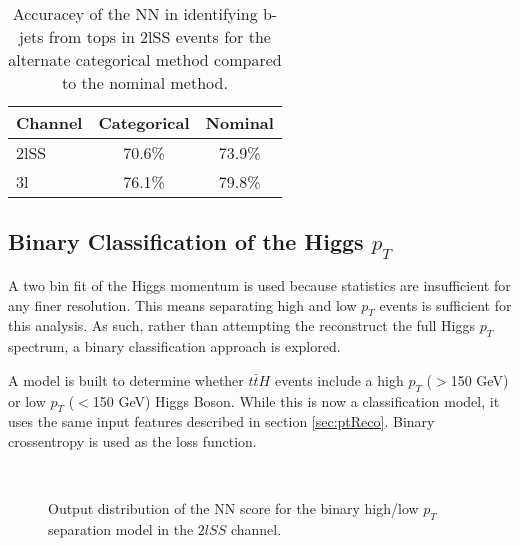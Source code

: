 \begin{table}[H]
  \centering
  \caption{Accuracey of the NN in identifying b-jets from tops in 2lSS events for the alternate categorical method compared to the nominal method.}
  \begin{tabular}{l|c|c}                                                                                                     
  \hline\hline
  Channel & Categorical & Nominal \\                                                                              
  \hline                                                                                                                  
  2lSS & 70.6\% & 73.9\% \\
  3l & 76.1\% & 79.8\% \\
  \hline                                                                                                                 
  \end{tabular}                                                                                                           
  \label{tab:topMatchCatApx}
\end{table}

\subsection{Binary Classification of the Higgs $p_T$}
\label{subsec:binPtApx}
                                                                                                                     
A two bin fit of the Higgs momentum is used because statistics are insufficient for any finer resolution. This means separating high and low $p_T$ events is sufficient for this analysis. As such, rather than attempting the reconstruct the full Higgs $p_T$ spectrum, a binary classification approach is explored.

A model is built to determine whether $t\bar{t}H$ events include a high $p_T$ ($>$150 GeV) or low $p_T$ ($<$150 GeV) Higgs Boson. While this is now a classification model, it uses the same input features described in section \ref{sec:ptReco}. Binary crossentropy is used as the loss function.

\begin{figure}[H]                                                                                                           
  \\
  \caption{Output distribution of the NN score for the binary high/low $p_T$ separation model in the $2lSS$ channel.}
  \label{fig:bin2lSSroc}                                                                          
\end{figure}

